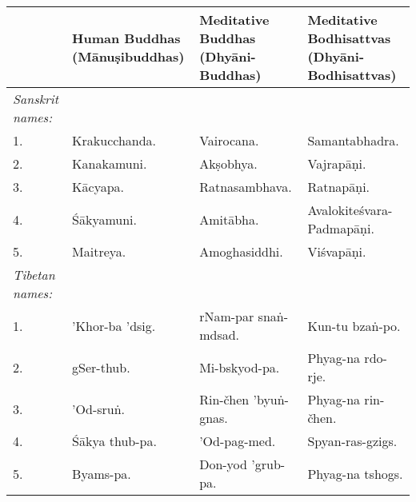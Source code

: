 \documentclass[a4paper, 12pt, oneside]{article}
\begin{document}
\begin{table}[H]
    \centering
    \footnotesize
    \begin{tabular}{p{19mm}|p{28mm}|p{33mm}|p{33mm}}
        ~ &  \textbf{Human Buddhas (M\={a}nu\d{s}ibuddhas)}  &  \textbf{Meditative Buddhas (Dhy\={a}ni-Buddhas)}  &  \textbf{Meditative Bodhisattvas (Dhy\={a}ni-Bodhisattvas)}  \\ \hline
         \emph{Sanskrit names:}  & ~ & ~ & ~ \\ \hline
        1. &  Krakucchanda.                  &  Vairocana.                           &  Samantabhadra.                                 \\
        2. &  Kanakamuni.                    &  Ak\d{s}obhya.                            &  Vajrap\={a}\d{n}i.                                     \\
        3. &  K\={a}cyapa.                       &  Ratnasambhava.                       &  Ratnap\={a}\d{n}i.                                     \\
        4. &  \'{S}\={a}kyamuni.                     &  Amit\={a}bha.                            &  Avalokite\'{s}vara-Padmap\={a}\d{n}i.                      \\
        5. &  Maitreya.                      &  Amoghasiddhi.                        &  Vi\'{s}vap\={a}\d{n}i.                                     \\ \hline
         \emph{Tibetan names:}   & ~ & ~ & ~ \\ \hline
        1. &  'Khor-ba 'dsig.                &  rNam-par sna\.{n}-mdsad.                 &  Kun-tu bza\.{n}-po.                                \\
        2. &  gSer-thub.                     &  Mi-bskyod-pa.                        &  Phyag-na rdo-rje.                              \\
        3. &  'Od-sru\.{n}.                      &  Rin-čhen 'byu\.{n}-gnas.                 &  Phyag-na rin-čhen.                             \\
        4. &  \'{S}\={a}kya thub-pa.                 &  'Od-pag-med.                         &  Spyan-ras-gzigs.                               \\
        5. &  Byams-pa.                      &  Don-yod 'grub-pa.                    &  Phyag-na tshogs. \\
    \end{tabular}
\end{table}
\end{document}
